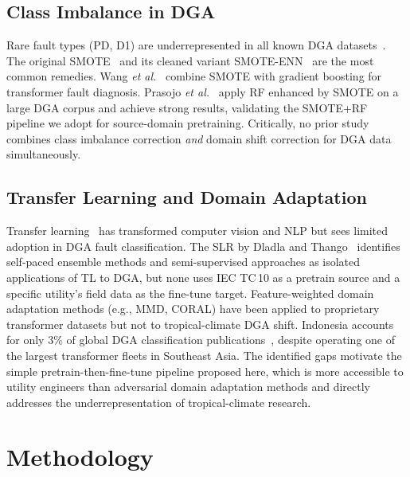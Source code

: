 \documentclass[conference]{IEEEtran}
\begin{document}
\subsection{Class Imbalance in DGA}
Rare fault types (PD, D1) are underrepresented in all known DGA
datasets~\cite{DladlaThango2025}.
The original SMOTE~\cite{Chawla2002SMOTE} and its cleaned variant
SMOTE-ENN~\cite{Batista2004SMOTEENN} are the most common remedies.
Wang \textit{et al.}~\cite{Wang2024SMOTE} combine SMOTE with
gradient boosting for transformer fault diagnosis.
Prasojo \textit{et al.}~\cite{Prasojo2023RFSMOTE} apply RF enhanced
by SMOTE on a large DGA corpus and achieve strong results,
validating the SMOTE+RF pipeline we adopt for source-domain
pretraining.
Critically, no prior study combines class imbalance correction
\emph{and} domain shift correction for DGA data simultaneously.

\subsection{Transfer Learning and Domain Adaptation}
Transfer learning~\cite{PanYang2010} has transformed computer vision
and NLP but sees limited adoption in DGA fault classification.
The SLR by Dladla and Thango~\cite{DladlaThango2025} identifies
self-paced ensemble methods and semi-supervised approaches as
isolated applications of TL to DGA, but none uses IEC TC\,10 as
a pretrain source and a specific utility's field data as the
fine-tune target.
Feature-weighted domain adaptation methods (e.g., MMD, CORAL) have
been applied to proprietary transformer datasets but not to
tropical-climate DGA shift.
Indonesia accounts for only 3\% of global DGA classification
publications~\cite{DladlaThango2025}, despite operating one of the
largest transformer fleets in Southeast Asia.
The identified gaps motivate the simple pretrain-then-fine-tune
pipeline proposed here, which is more accessible to utility engineers
than adversarial domain adaptation methods and directly addresses
the underrepresentation of tropical-climate research.

\section{Methodology}
\label{sec:method}
\end{document}
